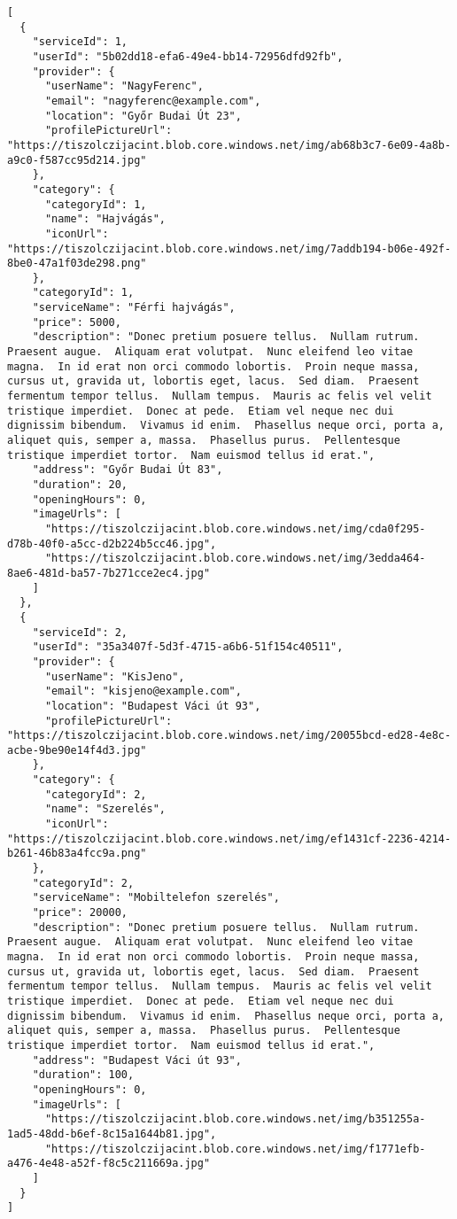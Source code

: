 \documentclass[11pt]{article}
\begin{document}
\begin{verbatim}
[
  {
    "serviceId": 1,
    "userId": "5b02dd18-efa6-49e4-bb14-72956dfd92fb",
    "provider": {
      "userName": "NagyFerenc",
      "email": "nagyferenc@example.com",
      "location": "Győr Budai Út 23",
      "profilePictureUrl": "https://tiszolczijacint.blob.core.windows.net/img/ab68b3c7-6e09-4a8b-a9c0-f587cc95d214.jpg"
    },
    "category": {
      "categoryId": 1,
      "name": "Hajvágás",
      "iconUrl": "https://tiszolczijacint.blob.core.windows.net/img/7addb194-b06e-492f-8be0-47a1f03de298.png"
    },
    "categoryId": 1,
    "serviceName": "Férfi hajvágás",
    "price": 5000,
    "description": "Donec pretium posuere tellus.  Nullam rutrum.  Praesent augue.  Aliquam erat volutpat.  Nunc eleifend leo vitae magna.  In id erat non orci commodo lobortis.  Proin neque massa, cursus ut, gravida ut, lobortis eget, lacus.  Sed diam.  Praesent fermentum tempor tellus.  Nullam tempus.  Mauris ac felis vel velit tristique imperdiet.  Donec at pede.  Etiam vel neque nec dui dignissim bibendum.  Vivamus id enim.  Phasellus neque orci, porta a, aliquet quis, semper a, massa.  Phasellus purus.  Pellentesque tristique imperdiet tortor.  Nam euismod tellus id erat.",
    "address": "Győr Budai Út 83",
    "duration": 20,
    "openingHours": 0,
    "imageUrls": [
      "https://tiszolczijacint.blob.core.windows.net/img/cda0f295-d78b-40f0-a5cc-d2b224b5cc46.jpg",
      "https://tiszolczijacint.blob.core.windows.net/img/3edda464-8ae6-481d-ba57-7b271cce2ec4.jpg"
    ]
  },
  {
    "serviceId": 2,
    "userId": "35a3407f-5d3f-4715-a6b6-51f154c40511",
    "provider": {
      "userName": "KisJeno",
      "email": "kisjeno@example.com",
      "location": "Budapest Váci út 93",
      "profilePictureUrl": "https://tiszolczijacint.blob.core.windows.net/img/20055bcd-ed28-4e8c-acbe-9be90e14f4d3.jpg"
    },
    "category": {
      "categoryId": 2,
      "name": "Szerelés",
      "iconUrl": "https://tiszolczijacint.blob.core.windows.net/img/ef1431cf-2236-4214-b261-46b83a4fcc9a.png"
    },
    "categoryId": 2,
    "serviceName": "Mobiltelefon szerelés",
    "price": 20000,
    "description": "Donec pretium posuere tellus.  Nullam rutrum.  Praesent augue.  Aliquam erat volutpat.  Nunc eleifend leo vitae magna.  In id erat non orci commodo lobortis.  Proin neque massa, cursus ut, gravida ut, lobortis eget, lacus.  Sed diam.  Praesent fermentum tempor tellus.  Nullam tempus.  Mauris ac felis vel velit tristique imperdiet.  Donec at pede.  Etiam vel neque nec dui dignissim bibendum.  Vivamus id enim.  Phasellus neque orci, porta a, aliquet quis, semper a, massa.  Phasellus purus.  Pellentesque tristique imperdiet tortor.  Nam euismod tellus id erat.",
    "address": "Budapest Váci út 93",
    "duration": 100,
    "openingHours": 0,
    "imageUrls": [
      "https://tiszolczijacint.blob.core.windows.net/img/b351255a-1ad5-48dd-b6ef-8c15a1644b81.jpg",
      "https://tiszolczijacint.blob.core.windows.net/img/f1771efb-a476-4e48-a52f-f8c5c211669a.jpg"
    ]
  }
]
\end{verbatim}
\end{document}

